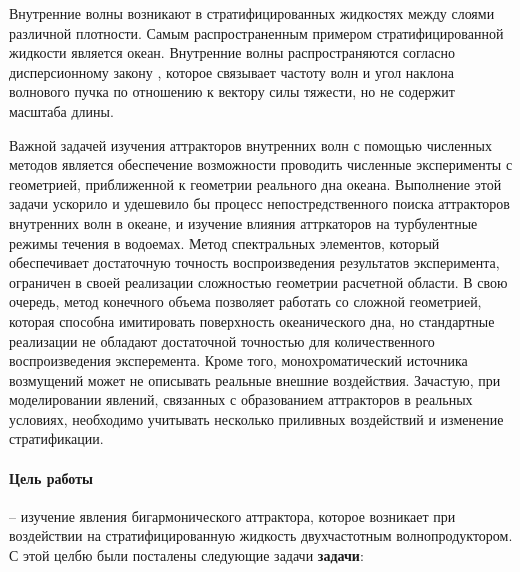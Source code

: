 \Introduction

Внутренние волны возникают в стратифицированных жидкостях между слоями различной плотности. Самым распространенным примером стратифицированной жидкости является океан.  Внутренние волны распространяются согласно дисперсионному закону \cite{MowbrayRarity1967}, которое связывает частоту волн и угол наклона волнового пучка по отношению к вектору силы тяжести, но не содержит масштаба длины. 



Важной задачей изучения аттракторов внутренних волн с помощью численных методов является обеспечение возможности проводить численные эксперименты с геометрией, приближенной к геометрии реального дна океана. Выполнение этой задачи ускорило и удешевило бы процесс непостредственного поиска аттракторов внутренних волн в океане, и изучение влияния аттркаторов на турбулентные режимы течения в водоемах. Метод спектральных элементов, который обеспечивает достаточную точность воспроизведения результатов эксперимента, ограничен в своей реализации сложностью геометрии расчетной области. В свою очередь, метод конечного объема позволяет работать со сложной геометрией, которая способна имитировать поверхность океанического дна, но стандартные реализации не обладают достаточной точностью для количественного воспроизведения эксперемента. Кроме того, монохроматический источника возмущений может не описывать реальные внешние воздействия. Зачастую, при моделировании явлений, связанных с образованием аттракторов в реальных условиях, необходимо учитывать несколько приливных воздействий \cite{Garrett1972} и изменение стратификации.

 

\paragraph{Цель работы} -- изучение явления бигармонического аттрактора, которое возникает при воздействии на стратифицированную жидкость двухчастотным волнопродуктором.  
С этой целбю были посталены следующие задачи \textbf{задачи}:

